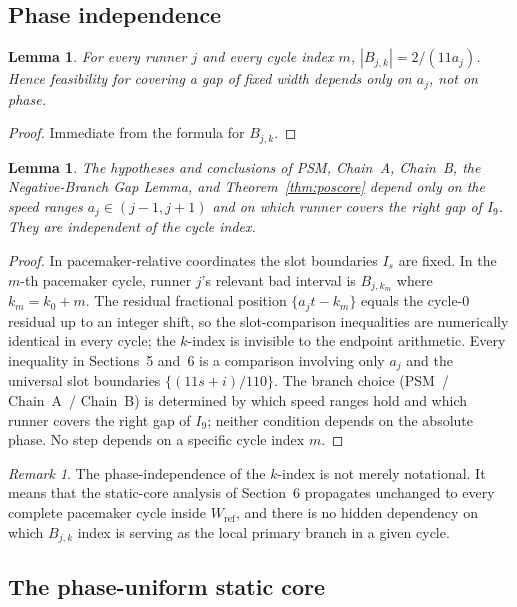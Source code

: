 \documentclass[12pt,a4paper]{amsart}
\newtheorem{lemma}[theorem]{Lemma}
\theoremstyle{definition}
\theoremstyle{remark}
\newtheorem{remark}[theorem]{Remark}
\newcommand{\Wref}{W_{\mathrm{ref}}}
\begin{document}
\subsection{Phase independence}

\begin{lemma}
For every runner $j$ and every cycle index $m$, $|B_{j,k}|=2/(11a_j)$.
Hence feasibility for covering a gap of fixed width depends only on $a_j$, not on phase.
\end{lemma}

\begin{proof}
Immediate from the formula for $B_{j,k}$.
\end{proof}

\begin{lemma}\label{lem:phaseindep2}
The hypotheses and conclusions of PSM, Chain~A, Chain~B, the Negative-Branch Gap Lemma,
and Theorem~\ref{thm:poscore} depend only on the speed ranges $a_j\in(j-1,j+1)$ and on
which runner covers the right gap of $I_9$. They are independent of the cycle index.
\end{lemma}

\begin{proof}
In pacemaker-relative coordinates the slot boundaries $I_s$ are fixed. In the $m$-th
pacemaker cycle, runner $j$'s relevant bad interval is $B_{j,k_m}$ where $k_m=k_0+m$.
The residual fractional position $\{a_jt - k_m\}$ equals the cycle-0 residual up to an
integer shift, so the slot-comparison inequalities are numerically identical in every cycle;
the $k$-index is invisible to the endpoint arithmetic. Every inequality in Sections~5
and~6 is a comparison involving only $a_j$ and the universal slot boundaries
$\{(11s+i)/110\}$. The branch choice (PSM~/ Chain~A~/ Chain~B) is determined by which
speed ranges hold and which runner covers the right gap of $I_9$; neither condition depends
on the absolute phase. No step depends on a specific cycle index $m$.
\end{proof}

\begin{remark}
The phase-independence of the $k$-index is not merely notational. It means that the
static-core analysis of Section~6 propagates unchanged to every complete pacemaker cycle
inside $\Wref$, and there is no hidden dependency on which $B_{j,k}$ index is serving as
the local primary branch in a given cycle.
\end{remark}

\subsection{The phase-uniform static core}
\end{document}
